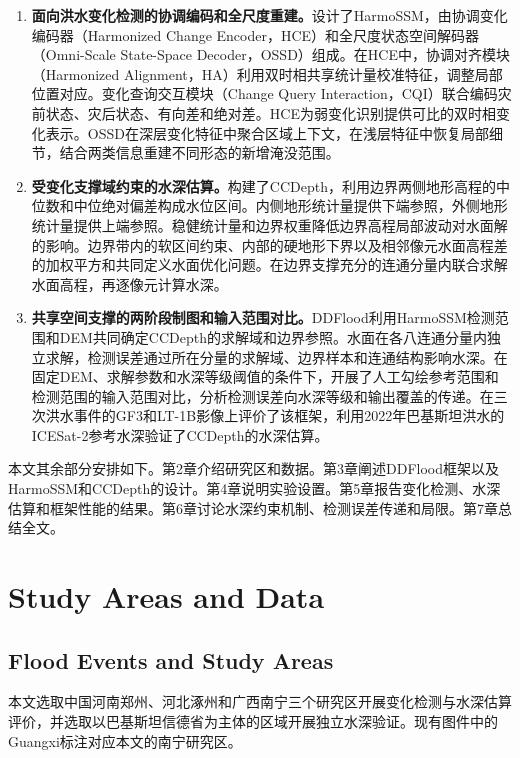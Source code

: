 \documentclass[authoryear,preprint,12pt]{elsarticle}
\begin{document}
\begin{enumerate}
  \item \textbf{面向洪水变化检测的协调编码和全尺度重建。}设计了HarmoSSM，由协调变化编码器（Harmonized Change Encoder，HCE）和全尺度状态空间解码器（Omni-Scale State-Space Decoder，OSSD）组成。在HCE中，协调对齐模块（Harmonized Alignment，HA）利用双时相共享统计量校准特征，调整局部位置对应。变化查询交互模块（Change Query Interaction，CQI）联合编码灾前状态、灾后状态、有向差和绝对差。HCE为弱变化识别提供可比的双时相变化表示。OSSD在深层变化特征中聚合区域上下文，在浅层特征中恢复局部细节，结合两类信息重建不同形态的新增淹没范围。

  \item \textbf{受变化支撑域约束的水深估算。}构建了CCDepth，利用边界两侧地形高程的中位数和中位绝对偏差构成水位区间。内侧地形统计量提供下端参照，外侧地形统计量提供上端参照。稳健统计量和边界权重降低边界高程局部波动对水面解的影响。边界带内的软区间约束、内部的硬地形下界以及相邻像元水面高程差的加权平方和共同定义水面优化问题。在边界支撑充分的连通分量内联合求解水面高程，再逐像元计算水深。

  \item \textbf{共享空间支撑的两阶段制图和输入范围对比。}DDFlood利用HarmoSSM检测范围和DEM共同确定CCDepth的求解域和边界参照。水面在各八连通分量内独立求解，检测误差通过所在分量的求解域、边界样本和连通结构影响水深。在固定DEM、求解参数和水深等级阈值的条件下，开展了人工勾绘参考范围和检测范围的输入范围对比，分析检测误差向水深等级和输出覆盖的传递。在三次洪水事件的GF3和LT-1B影像上评价了该框架，利用2022年巴基斯坦洪水的ICESat-2参考水深验证了CCDepth的水深估算。
\end{enumerate}

本文其余部分安排如下。第2章介绍研究区和数据。第3章阐述DDFlood框架以及HarmoSSM和CCDepth的设计。第4章说明实验设置。第5章报告变化检测、水深估算和框架性能的结果。第6章讨论水深约束机制、检测误差传递和局限。第7章总结全文。

\section{Study Areas and Data}

\subsection{Flood Events and Study Areas}

本文选取中国河南郑州、河北涿州和广西南宁三个研究区开展变化检测与水深估算评价，并选取以巴基斯坦信德省为主体的区域开展独立水深验证。现有图件中的Guangxi标注对应本文的南宁研究区。
\end{document}
